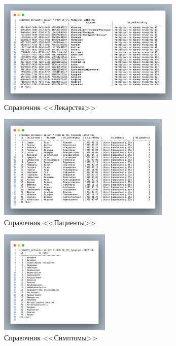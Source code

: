 \begin{figure}[p!h]
  \centering

  \includegraphics[height=5cm]
  {inc/DE_CTL_Medicines.png}

  \caption{Справочник <<Лекарства>>}

  \label{fig:DE_CTL_Medicines}
\end{figure}

\begin{figure}[p!h]
  \centering

  \includegraphics[height=5cm]
  {inc/DE_CTL_Patients.png}

  \caption{Справочник <<Пациенты>>}

  \label{fig:DE_CTL_Patients}
\end{figure}

\begin{figure}[p!h]
  \centering

  \includegraphics[height=5cm]
  {inc/DE_CTL_Symptoms.png}

  \caption{Справочник <<Симптомы>>}

  \label{fig:DE_CTL_Symptoms}
\end{figure}

